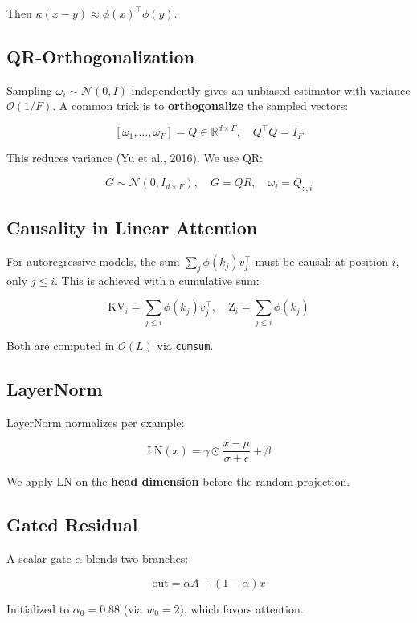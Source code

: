 Then $\kappa(x - y) \approx \phi(x)^\top \phi(y)$.

\subsection{QR-Orthogonalization}

Sampling $\omega_i \sim \mathcal{N}(0, I)$ independently gives an unbiased 
estimator with variance $\mathcal{O}(1/F)$. A common trick is to 
\textbf{orthogonalize} the sampled vectors:

\[
[\omega_1, \dots, \omega_F] = Q \in \mathbb{R}^{d \times F}, \quad Q^\top Q = I_F
\tag{3.7}
\]

This reduces variance (Yu et al., 2016). We use QR:

\[
G \sim \mathcal{N}(0, I_{d \times F}), \quad G = Q R, \quad \omega_i = Q_{:, i}
\tag{3.8}
\]

\subsection{Causality in Linear Attention}

For autoregressive models, the sum $\sum_j \phi(k_j) v_j^\top$ must be 
causal: at position $i$, only $j \leq i$. This is achieved with a 
cumulative sum:

\[
\text{KV}_i = \sum_{j \leq i} \phi(k_j) v_j^\top, \quad
\text{Z}_i = \sum_{j \leq i} \phi(k_j)
\tag{3.9}
\]

Both are computed in $\mathcal{O}(L)$ via \texttt{cumsum}.

\subsection{LayerNorm}

LayerNorm normalizes per example:

\[
\text{LN}(x) = \gamma \odot \frac{x - \mu}{\sigma + \epsilon} + \beta
\tag{3.10}
\]

We apply LN on the \textbf{head dimension} before the random projection.

\subsection{Gated Residual}

A scalar gate $\alpha$ blends two branches:

\[
\text{out} = \alpha A + (1 - \alpha) x
\tag{3.11}
\]

Initialized to $\alpha_0 = 0.88$ (via $w_0 = 2$), which favors attention.


